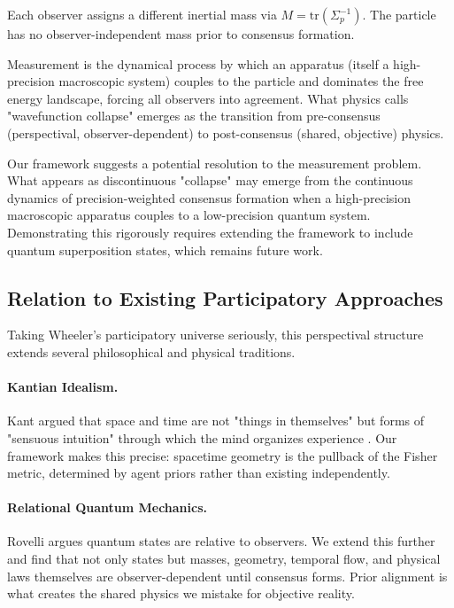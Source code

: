 \documentclass[11pt]{article}
\begin{document}
Each observer assigns a different inertial mass via $M = \mathrm{tr}(\Sigma_p^{-1})$. 
The particle has no observer-independent mass prior to consensus formation.

Measurement is the dynamical process by which an apparatus (itself a 
high-precision macroscopic system) couples to the particle and dominates the free energy landscape, forcing all observers into agreement. What physics calls "wavefunction collapse" emerges as the transition from pre-consensus (perspectival, observer-dependent) to post-consensus (shared, objective) physics.

Our framework suggests a potential resolution to the measurement problem. What appears as discontinuous "collapse" may emerge from the continuous dynamics of precision-weighted consensus formation when a high-precision macroscopic apparatus couples to a low-precision quantum system. Demonstrating this rigorously requires extending the framework to include quantum superposition states, which remains future work.


\subsection{Relation to Existing Participatory Approaches}

Taking Wheeler's participatory universe \cite{Wheeler1990} seriously,  this perspectival structure extends several philosophical and physical 
traditions.

\paragraph{Kantian Idealism.} Kant argued that space and time are not 
"things in themselves" but forms of "sensuous intuition" through which the mind organizes experience \cite{Kant1781}. Our framework makes this precise: spacetime geometry is the pullback of the Fisher metric, determined by agent priors rather than existing independently.

\paragraph{Relational Quantum Mechanics.} Rovelli \cite{Rovelli1996} 
argues quantum states are relative to observers. We extend this further and find that not only states but masses, geometry, temporal flow, and physical laws themselves are observer-dependent until consensus forms. Prior alignment is what creates the shared physics we mistake for objective reality.
\end{document}
